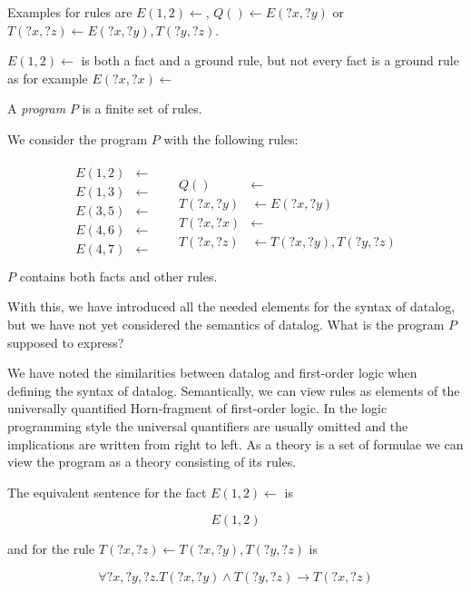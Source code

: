 \begin{example}
    Examples for rules are $E(1,2) \leftarrow $, $Q() \leftarrow E(?x,?y)$ or $T(?x,?z) \leftarrow E(?x, ?y), T(?y,?z)$.

    $E(1,2) \leftarrow $ is both a fact and a ground rule, but not every fact is a ground rule as for example $E(?x, ?x) \leftarrow$
\end{example}

A \textit{program} $P$ is a finite set of rules. 

\begin{example}\label{prelim:Program}
    We consider the program $P $ with the following rules:

    \begin{align*}
    \begin{split}
    E(1,2) &\leftarrow \\ E(1,3) &\leftarrow \\ E(3,5) &\leftarrow \\ E(4,6) &\leftarrow \\E(4,7) &\leftarrow\\\end{split} 
    &&
    \begin{split}
        Q() &\leftarrow \\ T(?x,?y) &\leftarrow E(?x,?y) \\ T(?x,?x) &\leftarrow \\ T(?x, ?z) &\leftarrow T(?x,?y), T(?y, ?z)
    \end{split}
    \end{align*}
    $P$ contains both facts and other rules.
\end{example}

With this, we have introduced all the needed elements for the syntax of datalog, but we have not yet considered the semantics of datalog. What is the program $P$ supposed to express?

We have noted the similarities between datalog and first-order logic when defining the syntax of datalog. Semantically, we can view rules as elements of the universally quantified Horn-fragment of first-order logic. In the logic programming style the universal quantifiers are usually omitted and the implications are written from right to left. As a theory is a set of formulae we can view the program as a theory consisting of its rules.


\begin{example}
    The equivalent sentence for the fact $E(1,2) \leftarrow$ is 
    
    \[E(1,2)\]
    
    
    and for the rule $T(?x, ?z) \leftarrow T(?x,?y), T(?y, ?z)$ is 
    
    \[\forall ?x,?y,?z. T(?x,?y) \land T(?y, ?z) \rightarrow T(?x, ?z)\]
\end{example}

